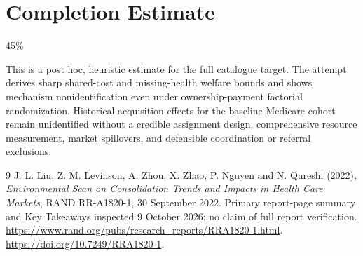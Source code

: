 \documentclass[11pt]{article}
\theoremstyle{remark}
\begin{document}
\section{Completion Estimate}
45\%

This is a post hoc, heuristic estimate for the full catalogue target.
The attempt derives sharp shared-cost and missing-health welfare bounds and shows mechanism nonidentification even under ownership-payment factorial randomization. Historical acquisition effects for the baseline Medicare cohort remain unidentified without a credible assignment design, comprehensive resource measurement, market spillovers, and defensible coordination or referral exclusions.

\begin{thebibliography}{9}
 J. L. Liu, Z. M. Levinson, A. Zhou, X. Zhao, P. Nguyen and N. Qureshi (2022), \emph{Environmental Scan on Consolidation Trends and Impacts in Health Care Markets}, RAND RR-A1820-1, 30 September 2022. Primary report-page summary and Key Takeaways inspected 9 October 2026; no claim of full report verification. \url{https://www.rand.org/pubs/research_reports/RRA1820-1.html}. \url{https://doi.org/10.7249/RRA1820-1}.
\end{thebibliography}
\end{document}
